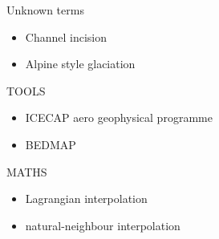 Unknown terms
{\small \begin{itemize}
\item{Channel incision}
\item{Alpine style glaciation}
\end{itemize}
}
\vspace{1cm}
TOOLS
{\small \begin{itemize}
\item{ICECAP aero geophysical programme}
\item{BEDMAP}
\end{itemize}
}
\vspace{1cm}
MATHS
{\small \begin{itemize}
\item{Lagrangian interpolation}
\item{natural-neighbour interpolation}
\end{itemize}
}


